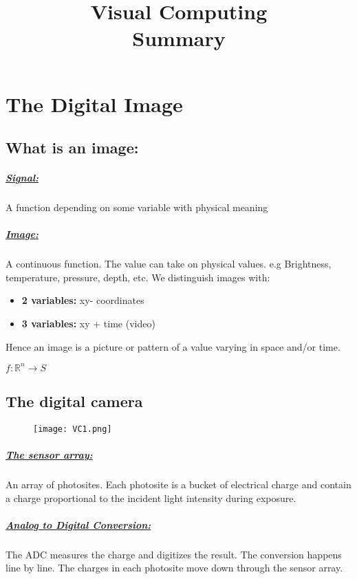 \documentclass[8pt]{extreport}
\title{Visual Computing\\ Summary}
\begin{document}
	\maketitle
	\newpage
\chapter{The Digital Image}

\section{What is an image:}

\paragraph{\underline{Signal:}} A function depending on some variable with physical meaning

\paragraph{\underline{Image:}} A continuous function. The value can take on physical values. e.g Brightness, temperature, pressure, depth, etc. We distinguish images with:
\begin{itemize}
\item \textbf{2 variables:} xy- coordinates
\item \textbf{3 variables:} xy + time (video)
\end{itemize}
Hence an image is a picture or pattern of a value varying in space and/or time.
\begin{center}
$f: \mathbb{R}^n \rightarrow S$
\end{center}

\section{The digital camera}
\begin{figure}[H]
\centering
\texttt{[image: VC1.png]}
\end{figure}


\paragraph{\underline{The sensor array:}} An array of photosites. Each photosite is a bucket of electrical charge and contain a charge proportional to the incident light intensity during exposure.

\paragraph{\underline{Analog to Digital Conversion:}} The ADC measures the charge and digitizes the result. The conversion happens line by line. The charges in each photosite move down through the sensor array.
\end{document}

